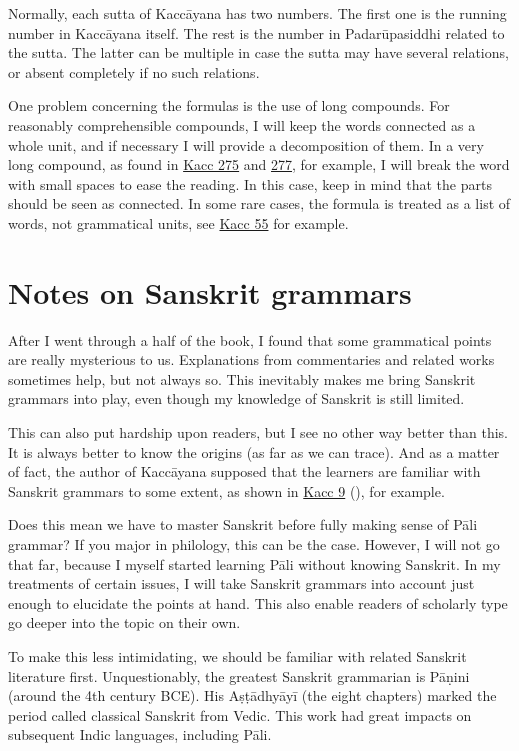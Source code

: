 Normally, each sutta of Kaccāyana has two numbers. The first one is the running number in Kaccāyana itself. The rest is the number in Padarūpasiddhi related to the sutta. The latter can be multiple in case the sutta may have several relations, or absent completely if no such relations.

One problem concerning the formulas is the use of long compounds. For reasonably comprehensible compounds, I will keep the words connected as a whole unit, and if necessary I will provide a decomposition of them. In a very long compound, as found in \hyperref[sut:275]{Kacc 275} and \hyperref[sut:277]{277}, for example, I will break the word with small spaces to ease the reading. In this case, keep in mind that the parts should be seen as connected. In some rare cases, the formula is treated as a list of words, not grammatical units, see \hyperref[sut:55]{Kacc 55} for example.

\section*{Notes on Sanskrit grammars}

After I went through a half of the book, I found that some grammatical points are really mysterious to us. Explanations from commentaries and related works sometimes help, but not always so. This inevitably makes me bring Sanskrit grammars into play, even though my knowledge of Sanskrit is still limited.

This can also put hardship upon readers, but I see no other way better than this. It is always better to know the origins (as far as we can trace). And as a matter of fact, the author of Kaccāyana supposed that the learners are familiar with Sanskrit grammars to some extent, as shown in \hyperref[sut:9]{Kacc 9} (), for example.

Does this mean we have to master Sanskrit before fully making sense of Pāli grammar? If you major in philology, this can be the case. However, I will not go that far, because I myself started learning Pāli without knowing Sanskrit. In my treatments of certain issues, I will take Sanskrit grammars into account just enough to elucidate the points at hand. This also enable readers of scholarly type go deeper into the topic on their own.

To make this less intimidating, we should be familiar with related Sanskrit literature first. Unquestionably, the greatest Sanskrit grammarian is Pāṇini (around the 4th century BCE). His Aṣṭādhyāyī (the eight chapters) marked the period called classical Sanskrit from Vedic. This work had great impacts on subsequent Indic languages, including Pāli.

